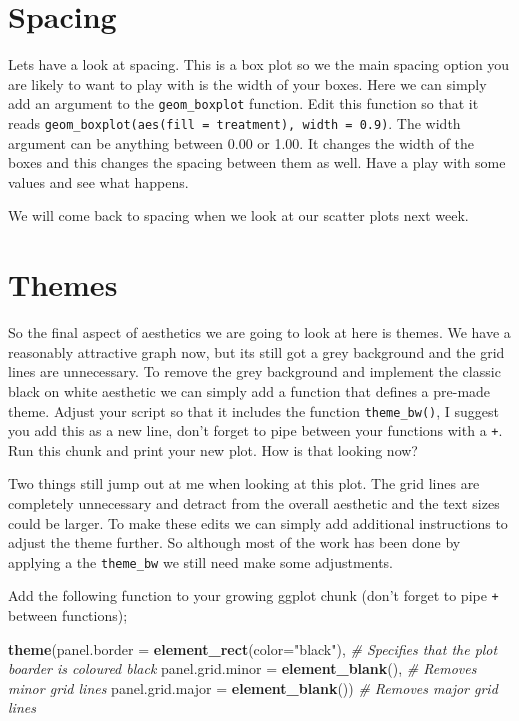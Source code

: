 \documentclass[
]{book}
\newenvironment{Shaded}{\begin{snugshade}}{\end{snugshade}}
\newcommand{\AttributeTok}[1]{\textcolor[rgb]{0.13,0.29,0.53}{#1}}
\newcommand{\CommentTok}[1]{\textcolor[rgb]{0.56,0.35,0.01}{\textit{#1}}}
\newcommand{\FunctionTok}[1]{\textcolor[rgb]{0.13,0.29,0.53}{\textbf{#1}}}
\newcommand{\NormalTok}[1]{#1}
\newcommand{\StringTok}[1]{\textcolor[rgb]{0.31,0.60,0.02}{#1}}
\begin{document}
\hypertarget{spacing}{%
\section{Spacing}\label{spacing}}

Lets have a look at spacing. This is a box plot so we the main spacing option you are likely to want to play with is the width of your boxes. Here we can simply add an argument to the \texttt{geom\_boxplot} function. Edit this function so that it reads \texttt{geom\_boxplot(aes(fill\ =\ treatment),\ width\ =\ 0.9)}. The width argument can be anything between 0.00 or 1.00. It changes the width of the boxes and this changes the spacing between them as well. Have a play with some values and see what happens.

We will come back to spacing when we look at our scatter plots next week.

\hypertarget{themes}{%
\section{Themes}\label{themes}}

So the final aspect of aesthetics we are going to look at here is themes. We have a reasonably attractive graph now, but its still got a grey background and the grid lines are unnecessary. To remove the grey background and implement the classic black on white aesthetic we can simply add a function that defines a pre-made theme. Adjust your script so that it includes the function \texttt{theme\_bw()}, I suggest you add this as a new line, don't forget to pipe between your functions with a \texttt{+}. Run this chunk and print your new plot. How is that looking now?

Two things still jump out at me when looking at this plot. The grid lines are completely unnecessary and detract from the overall aesthetic and the text sizes could be larger. To make these edits we can simply add additional instructions to adjust the theme further. So although most of the work has been done by applying a the \texttt{theme\_bw} we still need make some adjustments.

Add the following function to your growing ggplot chunk (don't forget to pipe \texttt{+} between functions);

\begin{Shaded}
\begin{Highlighting}[]
\FunctionTok{theme}\NormalTok{(}\AttributeTok{panel.border =} \FunctionTok{element\_rect}\NormalTok{(}\AttributeTok{color=}\StringTok{"black"}\NormalTok{), }\CommentTok{\# Specifies that the plot boarder is coloured black}
        \AttributeTok{panel.grid.minor =} \FunctionTok{element\_blank}\NormalTok{(), }\CommentTok{\# Removes minor grid lines }
        \AttributeTok{panel.grid.major =} \FunctionTok{element\_blank}\NormalTok{()) }\CommentTok{\# Removes major grid lines }
\end{Highlighting}
\end{Shaded}
\end{document}

